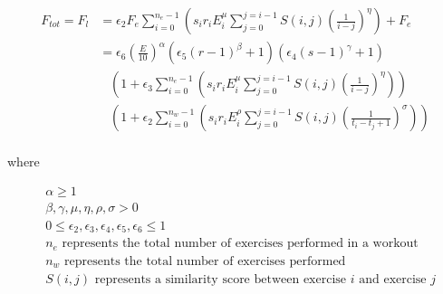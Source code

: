 \begin{minipage}{\textwidth}
	\begin{equation}
		\label{eq:P2C1_LatentFatigue}
		\begin{split}
			F_{tot} = F_l & = 
			\epsilon_2 F_e 
			\sum_{i=0}^{n_e-1} \left( 
				s_i r_i E_i^\mu 
				\sum_{j=0}^{j=i-1} S(i,j)\left(
					\frac{1}{i-j}
				\right)^\eta
			\right)
			+ F_e
			\\
			& = \epsilon_6 \left( \frac{E}{10} \right)^\alpha
				\left( \epsilon_5 (r-1)^\beta + 1 \right)
				\left(\epsilon_4 (s-1)^\gamma+1  \right)
				\\
				& \;\;\;
				\left(
					1+\epsilon_3 \sum_{i=0}^{n_e-1} \left( 
						s_i r_i E_i^\mu 
						\sum_{j=0}^{j=i-1} S(i,j)\left(
							\frac{1}{i-j}
						\right)^\eta
					\right)
				\right)
				\\
				& \;\;\;
				\left(
					1+\epsilon_2 \sum_{i=0}^{n_w-1} \left( 
						s_i r_i E_i^\rho
						\sum_{j=0}^{j=i-1} S(i,j)\left(
							\frac{1}{t_i-t_j+1}
						\right)^\sigma
					\right)
				\right)
			\\
		\end{split}
	\end{equation}
	\centerline{where}
	\begin{equation*}
		\begin{split}
		    & \alpha \ge 1 \\
		    & \beta,\gamma, \mu, \eta, \rho, \sigma > 0 \\
			& 0 \le \epsilon_2, \epsilon_3, \epsilon_4, \epsilon_5, \epsilon_6 \le 1 \\
			& n_e \text{ represents the total number of exercises performed in a workout} \\
			& n_w \text{ represents the total number of exercises performed} \\
			& S(i,j) \text{ represents a similarity score between exercise }i \text{ and exercise }j \\
		\end{split}
	\end{equation*}
\end{minipage}\\

